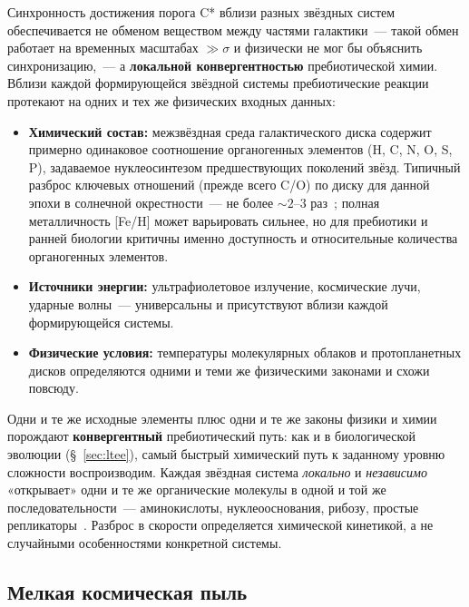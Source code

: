 \documentclass[12pt,a4paper]{article}
\begin{document}
Синхронность достижения порога C* вблизи разных звёздных систем обеспечивается не обменом веществом между частями галактики~--- такой обмен работает на временных масштабах $\gg \sigma$ и физически не мог бы объяснить синхронизацию,~--- а \textbf{локальной конвергентностью} пребиотической химии. Вблизи каждой формирующейся звёздной системы пребиотические реакции протекают на одних и тех же физических входных данных:

\begin{itemize}
   \item \textbf{Химический состав:} межзвёздная среда галактического диска содержит примерно одинаковое соотношение органогенных элементов (H, C, N, O, S, P), задаваемое нуклеосинтезом предшествующих поколений звёзд. Типичный разброс ключевых отношений (прежде всего C/O) по диску для данной эпохи в солнечной окрестности~--- не более $\sim 2$--$3$ раз~\cite{Oberg2021,BrewerFischer2016}; полная металличность [Fe/H] может варьировать сильнее, но для пребиотики и ранней биологии критичны именно доступность и относительные количества органогенных элементов.
   \item \textbf{Источники энергии:} ультрафиолетовое излучение, космические лучи, ударные волны~--- универсальны и присутствуют вблизи каждой формирующейся системы.
   \item \textbf{Физические условия:} температуры молекулярных облаков и протопланетных дисков определяются одними и теми же физическими законами и схожи повсюду.
\end{itemize}

Одни и те же исходные элементы плюс одни и те же законы физики и химии порождают \textbf{конвергентный} пребиотический путь: как и в биологической эволюции (\S~\ref{sec:ltee}), самый быстрый химический путь к заданному уровню сложности воспроизводим. Каждая звёздная система \emph{локально} и \emph{независимо} «открывает» одни и те же органические молекулы в одной и той же последовательности~--- аминокислоты, нуклеооснования, рибозу, простые репликаторы~\cite{Furukawa2019,Callahan2011,Oberg2021}. Разброс в скорости определяется химической кинетикой, а не случайными особенностями конкретной системы.

\subsection{Мелкая космическая пыль}
\label{sec:idp_dust}
\end{document}
